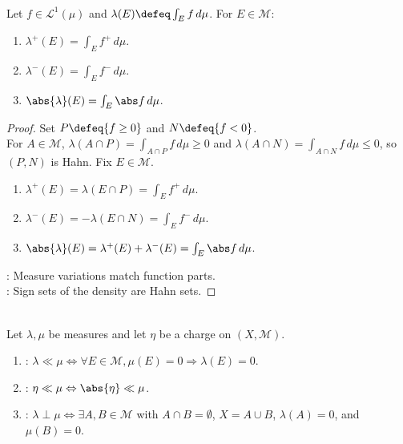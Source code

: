 \begin{theorem} \label{thm:integral-charge-variation-density} \\
Let $f\in\mathscr{L}^1(\mu)$ and $\lambda(E)\defeq\int_E f\,d\mu$. For $E\in\mathcal{M}$:
\begin{enumerate}[label=(\roman*)]
\setlength{\itemsep}{0pt}
\item $\lambda^+(E)=\int_E f^+\,d\mu$.
\item $\lambda^-(E)=\int_E f^-\,d\mu$.
\item $\abs{\lambda}(E)=\int_E\abs f\,d\mu$.
\end{enumerate}
\begin{proof} Set $P\defeq\{f\geq0\}$ and $N\defeq\{f<0\}$.\\
For $A\in\mathcal{M}$, $\lambda(A\cap P)=\int_{A\cap P}f\,d\mu\geq0$ and $\lambda(A\cap N)=\int_{A\cap N}f\,d\mu\leq0$, so $(P,N)$ is Hahn. Fix $E\in\mathcal{M}$.
\begin{enumerate}[label=(\roman*)]
\setlength{\itemsep}{0pt}
\item $\lambda^+(E)=\lambda(E\cap P)=\int_E f^+\,d\mu$.
\item $\lambda^-(E)=-\lambda(E\cap N)=\int_E f^-\,d\mu$.
\item $\abs{\lambda}(E)=\lambda^+(E)+\lambda^-(E)=\int_E\abs f\,d\mu$.
\end{enumerate}
: Measure variations match function parts.\\
: Sign sets of the density are Hahn sets.
\end{proof}
\end{theorem}

\begin{definition} \label{def:absolute-continuity-and-singularity-measures} \\
Let $\lambda,\mu$ be measures and let $\eta$ be a charge on $(X,\mathcal{M})$.
\begin{enumerate}[label=(\roman*)]
\setlength{\itemsep}{0pt}
\item {}: $\lambda\ll\mu\Leftrightarrow\forall E\in\mathcal{M},\mu(E)=0\Rightarrow\lambda(E)=0$.
\item {}: $\eta\ll\mu\Leftrightarrow\abs{\eta}\ll\mu$.
\item {}: $\lambda\perp\mu\Leftrightarrow\exists A,B\in\mathcal{M}$ with $A\cap B=\emptyset$, $X=A\cup B$, $\lambda(A)=0$, and $\mu(B)=0$.
\end{enumerate}
\end{definition}

